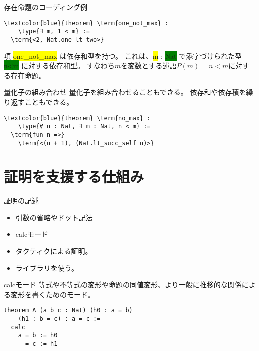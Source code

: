 \documentclass[unicode,12pt]{beamer}%
\newcommand{\type}[1]{\colorbox{green}{#1}}
\newcommand{\term}[1]{\colorbox{yellow}{#1}}
\begin{document}
\begin{frame}[fragile]{存在命題のコーディング例}
  \begin{tcolorbox}[title=Quantifier.lean]
  \setlength{\baselineskip}{12pt}
  \begin{Verbatim}[commandchars=\\\{\}, baselinestretch=1.5]
\textcolor{blue}{theorem} \term{one_not_max} :
    \type{∃ m, 1 < m} :=
  \term{<2, Nat.one_lt_two>}
  \end{Verbatim}
  \end{tcolorbox}  

  項 \term{one\_not\_max} は依存和型を持つ。
  これは、\term{m} : \type{Nat} で添字づけられた型 \type{n<m} に対する依存和型。
  すなわち$m$を変数とする述語$P(m)=n<m$に対する存在命題。
\end{frame}

\begin{frame}[fragile]{量化子の組み合わせ}
  量化子を組み合わせることもできる。
  依存和や依存積を繰り返すこともできる。

  \begin{tcolorbox}[title=Quantifier.lean]
    \setlength{\baselineskip}{12pt}
    \begin{Verbatim}[commandchars=\\\{\}, baselinestretch=1.5]
\textcolor{blue}{theorem} \term{no_max} :
    \type{∀ n : Nat, ∃ m : Nat, n < m} :=
  \term{fun n =>}
    \term{<(n + 1), (Nat.lt_succ_self n)>}
    \end{Verbatim}
    \end{tcolorbox}  
\end{frame}

\section{証明を支援する仕組み}

\begin{frame}{証明の記述}
  \begin{itemize}
    \item 引数の省略やドット記法
    \item calcモード
    \item タクティクによる証明。
    \item ライブラリを使う。
  \end{itemize}
\end{frame}

\begin{frame}[fragile]{calcモード}
  等式や不等式の変形や命題の同値変形、より一般に推移的な関係による変形を書くためのモード。
  \begin{tcolorbox}[title=Assist.lean]
    \setlength{\baselineskip}{12pt}
    \begin{Verbatim}[commandchars=\\\{\}, baselinestretch=1.5]
theorem A (a b c : Nat) (h0 : a = b)
    (h1 : b = c) : a = c :=
  calc
    a = b := h0
    _ = c := h1  
    \end{Verbatim}
    \end{tcolorbox}  
\end{frame}
\end{document}
